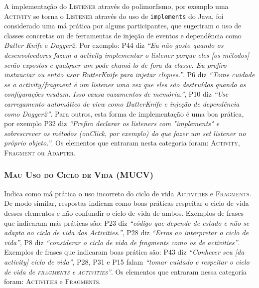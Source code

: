 A implementação do \textsc{Listener} através do polimorfismo, por exemplo uma \textsc{Activity} se torna o \textsc{Listener} através do uso de \texttt{implements} do Java, foi considerado uma má prática por alguns participantes, que sugeriram o uso de classes concretas ou de ferramentas de injeção de eventos e dependência como \textit{Butter Knife} \cite{ButterKnife} e \textit{Dagger2}. Por exemplo: P44 diz \textit{``Eu não gosto quando os desenvolvedores fazem a activity implementar o listener porque eles [os métodos] serão expostos e qualquer um pode chamá-lo de fora da classe. Eu prefiro instanciar ou então usar ButterKnife para injetar cliques.''}. P6 diz \textit{``Tome cuidade se a activity/fragment é um listener uma vez que eles são destruídos quando as configurações mudam. Isso causa vazamentos de memória.''}, P10 diz \textit{``Use carregamento automático de view como ButterKnife e injeção de dependência como Dagger2''}. Para outros, esta forma de implementação é uma boa prática, por exemplo P32 diz \textit{``Prefiro declarar os listeners com "implements" e sobrescrever os métodos (onClick, por exemplo) do que fazer um set listener no próprio objeto.''}. Os elementos que entraram nesta categoria foram: \textsc{Activity}, \textsc{Fragment} ou \textsc{Adapter}.

\subsubsection{\textsc{Mau Uso do Ciclo de Vida (MUCV)}}
Indica como má prática o uso incorreto do ciclo de vida \textsc{Activities} e \textsc{Fragments}. De modo similar, respostas indicam como boas práticas respeitar o ciclo de vida desses elementos e não confundir o ciclo de vida de ambos. Exemplos de frases que indicaram más práticas são: P23 diz \textit{``código que depende de estado e não se adapta ao ciclo de vida das Activities.''}, P28 diz \textit{``Erros ao interpretar o ciclo de vida''}, P8 diz \textit{``considerar o ciclo de vida de fragments como os de activities''}. Exemplos de frases que indicaram boas prática são: P43 diz \textit{``Conhecer seu [da activity] ciclo de vida''}, P28, P31 e P15 falam \textit{``tomar cuidado e respeitar o ciclo de vida de \textsc{fragments} e \textsc{activities}''}. Os elementos que entraram nessa categoria foram: \textsc{Activities} e \textsc{Fragments}. 

